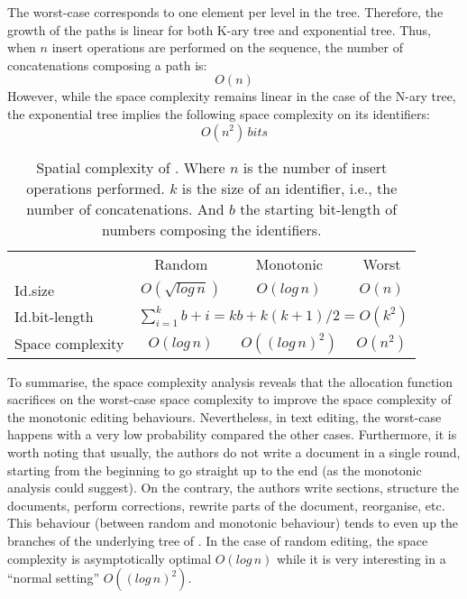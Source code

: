 \begin{asparadesc}
\item [The worst-case] corresponds to one element per level in the
  tree. Therefore, the growth of the paths is linear for both K-ary tree and
  exponential tree. Thus, when $n$ insert operations are performed on the
  sequence, the number of concatenations composing a path is:
  \begin{equation} O(n) \end{equation} However, while the space complexity
  remains linear in the case of the N-ary tree, the exponential tree implies
  the following space complexity on its identifiers:
  \begin{equation} O(n^2) \, bits \end{equation}
\end{asparadesc}

\begin{table}
  \centering
  \begin{tabular}{@{}lccc@{}}
    \toprule
    & Random & Monotonic & Worst \\ \cmidrule{2-4}
    Id.size & $O(\sqrt{log\,n})$ & $O(log\,n)$ & $O(n)$ \\ \midrule
    Id.bit-length & \multicolumn{3}{c}{ $\sum\limits_{i=1}^{k}b+i =
      kb + k(k+1)/2 = O(k^2)$} \\ \midrule
    Space complexity & $O(log\,n)$ & $O((log\,n)^2)$ &
    $O(n^2)$ \\ \bottomrule
  \end{tabular}
  \caption{Spatial complexity of \LSEQ. Where $n$ is the number
    of insert operations performed. $k$ is the size of an identifier, i.e.,
    the number of concatenations. And $b$ the starting bit-length of numbers
    composing the identifiers.}
\end{table}

To summarise, the space complexity analysis reveals that the allocation function
\LSEQ sacrifices on the worst-case space complexity to improve the space
complexity of the monotonic editing behaviours. Nevertheless, in text editing,
the worst-case happens with a very low probability compared the other
cases. Furthermore, it is worth noting that usually, the authors do not write a
document in a single round, starting from the beginning to go straight up to the
end (as the monotonic analysis could suggest). On the contrary, the authors
write sections, structure the documents, perform corrections, rewrite parts of
the document, reorganise, etc. This behaviour (between random and monotonic
behaviour) tends to even up the branches of the underlying tree of \LSEQ. In the
case of random editing, the space complexity is asymptotically optimal
$O(log\,n)$ while it is very interesting in a ``normal setting''
$O((log\,n)^2)$.

